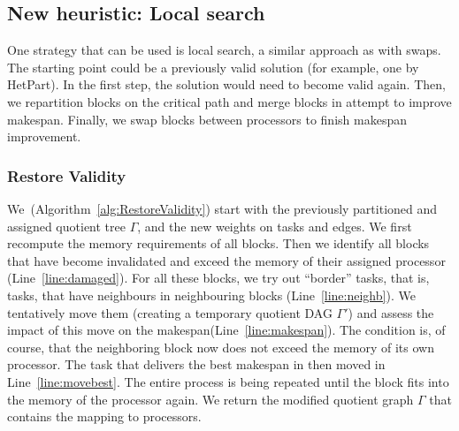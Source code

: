 \documentclass[11pt]{article}
\begin{document}
    \subsection{New heuristic: Local search}
    One strategy that can be used is local search, a similar approach as with swaps.
    The starting point could be a previously valid solution (for example, one by HetPart).
    In the first step, the solution would need to become valid again.
    Then, we repartition blocks on the critical path and merge blocks in attempt to improve makespan.
    Finally, we swap blocks between processors to finish makespan improvement.

    \subsubsection{Restore Validity}
    We~(Algorithm~\ref{alg:RestoreValidity}) start with the previously partitioned and assigned quotient tree $\Gamma$,
    and the new weights on tasks and edges.
    We first recompute the memory requirements of all blocks.
    Then we identify all blocks that have become invalidated and exceed the memory of their assigned processor
    (Line~\ref{line:damaged}).
    For all these blocks, we try out ``border'' tasks, that is, tasks, that have neighbours in neighbouring blocks
    (Line~\ref{line:neighb}).
    We tentatively move them (creating a temporary quotient DAG $\Gamma'$) and assess the impact of this move on the
    makespan(Line~\ref{line:makespan}).
    The condition is, of course, that the neighboring block now does not exceed the memory of its own processor.
    The task that delivers the best makespan in then moved in Line~\ref{line:movebest}.
    The entire process is being repeated until the block fits into the memory of the processor again.
    We return the modified quotient graph $\Gamma$ that contains the mapping to processors.
\end{document}
